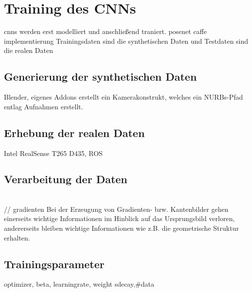 
\section{Training des CNNs}
cnns werden erst modelliert und anschließend traniert.
posenet caffe implementierung
Trainingsdaten sind die synthetischen Daten und Testdaten sind die realen Daten


\subsection{Generierung der synthetischen Daten}
Blender,
eigenes Addons erstellt ein Kamerakonstrukt, welches ein NURBs-Pfad entlag Aufnahmen erstellt.

\subsection{Erhebung der realen Daten}
Intel RealSense T265 D435, ROS

\subsection{Verarbeitung der Daten}
\\ // gradienten
Bei der Erzeugung von Gradienten- bzw. Kantenbilder gehen einerseits wichtige Informationen im Hinblick auf das Ursprungsbild verloren, andererseits bleiben wichtige Informationen wie z.B. die geometrische Struktur erhalten.
\subsection{Trainingsparameter}

optimizer, beta,
learningrate,
weight sdecay,#data